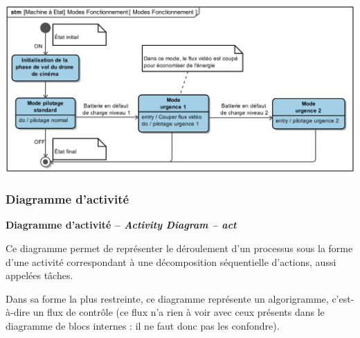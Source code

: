 \documentclass[11pt,oneside]{article}
\begin{document}
\begin{exemple}
\begin{center}
\includegraphics[width=.9\textwidth]{png/PNG/SysML_Drone_Stm}
\end{center}
\end{exemple}

\subsubsection{Diagramme d'activité}

\begin{defi}
\textbf{Diagramme d'activité -- \textit{Activity Diagram -- act}}

Ce diagramme permet de représenter le déroulement d’un processus sous la forme d’une
activité correspondant à une décomposition séquentielle d’actions, aussi appelées tâches.

Dans sa forme la plus restreinte, ce diagramme représente un algorigramme, c’est-à-dire
un flux de contrôle (ce flux n’a rien à voir avec ceux présents dans le diagramme de blocs
internes : il ne faut donc pas les confondre).
\end{defi}
\end{document}
